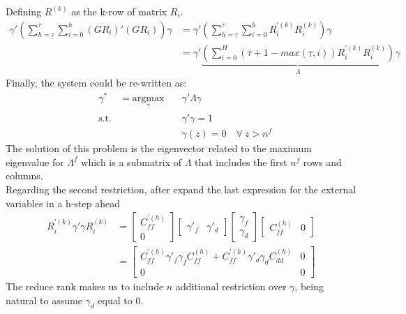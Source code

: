 \documentclass[12pt, a4paper]{article}
\begin{document}
Defining $R^{(k)}$ as the k-row of matrix $R_i$.
\begin{equation*}
\begin{aligned}
\gamma' \left( \sum_{h =\underline{\tau}}^{\overline{\tau}}\sum_{i=0}^h  (G R_{i})'(G R_{i}) \right) \gamma &= \gamma' \left( \sum_{h =\underline{\tau}}^{\overline{\tau}}\sum_{i=0}^h  R^{'(k)}_i R^{(k)}_i \right) \gamma \\
&= \gamma' \underbrace{\left(\sum_{i=0}^H (\overline{\tau}+1-max(\underline{\tau},i)) R^{'(k)}_iR^{(k)}_i \right)}_{\Lambda} \gamma
\end{aligned}
\end{equation*}
Finally, the system could be re-written as:
\begin{equation*}
\begin{aligned}
& \gamma^* &= \underset{\gamma}{\text{argmax}}  \quad
& \gamma' \Lambda  \gamma \\
& \text{s.t.}
&  & \gamma' \gamma = 1 \\
&  & & \gamma(z)  = 0 \quad \forall \ z>n^f
\end{aligned}
\end{equation*}
The solution of this problem is the eigenvector related to the maximum eigenvalue for $\Lambda^f$ which is a submatrix of $\Lambda$ that includes the first $n^f$ rows and columns. \\
Regarding the second restriction, after expand the last expression for the external variables in a h-step ahead
\begin{equation*}
\begin{aligned}
R^{'(k)}_i\gamma' \gamma R_i^{(k)} &= \left[ \begin{array}{c}  C_{ff}^{'(h)}  \\ 0 \end{array} \right] \left[ \begin{array}{cc}  \gamma'_f & \gamma'_d  \end{array} \right] \left[ \begin{array}{c}  \gamma_f  \\ \gamma_d  \end{array} \right]
\left[ \begin{array}{cc}  C_{ff}^{(h)} &  0 \end{array} \right] \\
&= \left[ \begin{array}{cc} C^{'(h)}_{ff}\gamma'_f \gamma_f C^{(h)}_{ff} + C^{'(h)}_{ff}\gamma'_d \gamma_d C^{(h)}_{dd}  & 0 \\ 0 & 0 \end{array} \right]
\end{aligned}
\end{equation*}
The reduce rank makes us to include $n$ additional restriction over $\gamma$, being natural to assume $\gamma_d$ equal to 0.
\end{document}

